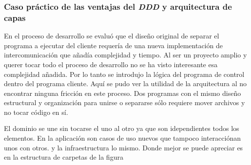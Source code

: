 \subsubsection{Caso práctico de las ventajas del \textit{DDD} y arquitectura de capas}

En el proceso de desarrollo se evaluó que el diseño original de separar el programa a ejecutar del cliente requería de una nueva implementación de intercomunicación que añadía complejidad y tiempo. Al ser un proyecto amplio y querer tocar todo el proceso de desarrollo no se ha visto interesante esa complejidad añadida. Por lo tanto se introdujo la lógica del programa de control dentro del programa cliente. Aquí se pudo ver la utilidad de la arquitectura al no encontrar ninguna fricción en este proceso. Dos programas con el mismo diseño estructural y organización para unirse o separarse sólo requiere mover archivos y no tocar código en sí.

El dominio se une sin tocarse el uno al otro ya que son idependientes todos los elementos. En la aplicación son casos de uso nuevos que tampoco interacciónan unos con otros. y la infraestructura lo mismo. Donde mejor se puede apreciar es en la estructura de carpetas de la figura


